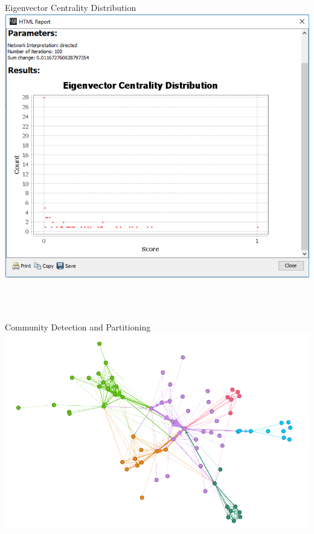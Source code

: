 \documentclass[11pt,a4paper,oneside]{article}
\begin{document}
    \begin{center}
    	Eigenvector Centrality Distribution \\
    	\includegraphics[scale=0.4]{2.png}				   
    \end{center}

	 \begin{verbatim}
	
	
	\end{verbatim}

    \begin{center}
     	Community Detection and Partitioning \\
     	\includegraphics[scale=0.6]{3.png}				   
    \end{center}	
	
\end{document}
